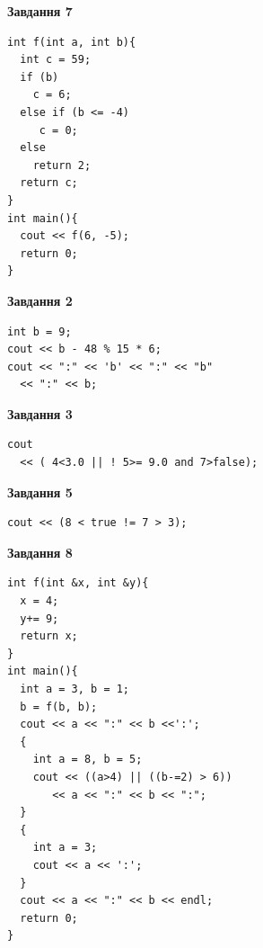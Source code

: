 \documentclass[12pt, ukrainian]{article}
\begin{document}
{\begin {large}
\begin{minipage}[t]{7.0cm}
\begin{center}
\textbf{Завдання 7}
\end{center}
\vspace{-8mm}

\begin{verbatim}
int f(int a, int b){
  int c = 59;
  if (b)
    c = 6;
  else if (b <= -4)
     c = 0;
  else
    return 2;
  return c;
}
int main(){
  cout << f(6, -5);
  return 0;
}
\end{verbatim}

\end{minipage}
\vline \hspace{1mm}
\begin{minipage}[t]{11.0cm}

\begin{center}
\textbf{Завдання 2}
\end{center}
\vspace{-8mm}

\begin{verbatim}
int b = 9;
cout << b - 48 % 15 * 6;
cout << ":" << 'b' << ":" << "b" 
  << ":" << b;
\end{verbatim}



\begin{center}
\textbf{Завдання 3}
\end{center}
\vspace{-8mm}

\begin{verbatim}
cout 
  << ( 4<3.0 || ! 5>= 9.0 and 7>false);
\end{verbatim}



\begin{center}
\textbf{Завдання 5}
\end{center}
\vspace{-8mm}

\begin{verbatim}
cout << (8 < true != 7 > 3);
\end{verbatim}



\begin{center}
\textbf{Завдання 8}
\end{center}
\vspace{-8mm}

\begin{verbatim}
int f(int &x, int &y){
  x = 4;
  y+= 9;
  return x;
}
int main(){
  int a = 3, b = 1;
  b = f(b, b);
  cout << a << ":" << b <<':';
  {
    int a = 8, b = 5;
    cout << ((a>4) || ((b-=2) > 6))
       << a << ":" << b << ":";
  }
  {
    int a = 3;
    cout << a << ':';
  }
  cout << a << ":" << b << endl;
  return 0;
}
\end{verbatim}


\end{minipage}
\end{large}}
\end{document}
